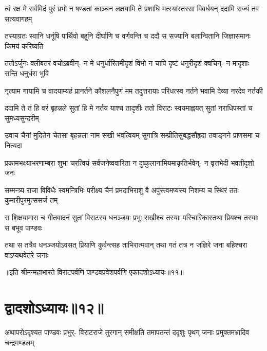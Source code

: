 \fourlineindentedshloka
{त्वं रक्ष मे सर्वमिदं पुरं प्रभो}
{न षण्डतां काञ्चन लक्षयामि ते}
{प्रशाधि मत्स्यांस्तरसा विवर्धयन्}
{ददामि राज्यं तव सत्यवागहम्}



\fourlineindentedshloka
{तस्याग्रतः स्वानि धनूंषि पार्थिवो}
{बहूनि दीर्घाणि च वर्णवन्ति च}
{ददौ स सज्यानि बलान्वितानि}
{जिज्ञासमानः किमयं करिष्यति}


\fourlineindentedshloka
{ततोऽर्जुनः क्लीबतरं वचोऽब्रवीन्-}
{न मे धनुर्धारितमीदृशं विभो}
{न चापि दृष्टं धनुरीदृशं क्वचिन्-}
{न मादृशाः सन्ति धनुर्धरा भुवि}


\fourlineindentedshloka
{नृत्याम गायामि च वादयाम्यहं}
{प्रानर्तने कौशलनैपुणं मम}
{तदुत्तरायाः परिधत्स्व नर्तने}
{भवामि देव्या नरदेव नर्तकी}




\fourlineindentedshloka
{ददामि ते तं हि वरं बृहन्नले}
{सुतां हि मे नर्तय याश्च तादृशीः}
{ततो विराटः स्वयमाह्वयत् सुतां}
{नराधिपस्तां च सुमध्यसुन्दरीम्}


\fourlineindentedshloka
{उवाच चैनां मुदितेन चेतसा}
{बृहन्नला नाम सखी भवत्वियम्}
{सुगात्रि सम्प्रीतिसुबद्धसौहृदा}
{तवाङ्गने प्राणसमा च नित्यदा}


\fourlineindentedshloka
{प्रकामभक्ष्याभरणाम्बरा शुभा}
{चरत्वियं सर्वजनेष्ववारिता}
{न दुष्कुलानामियमाकृतिर्भवेन्-}
{न वृत्तभेदी भवतीदृशो जनः}



\fourlineindentedshloka
{सम्मन्त्र्य राजा विविधैः स्वमन्त्रिभिः}
{परीक्ष्य चैनं प्रमदाभिराशु वै}
{अपुंस्त्वमप्यस्य निशम्य च स्थिरं}
{ततः कुमारीपुरमुत्ससर्ज तम्}


\fourlineindentedshloka
{स शिक्षयामास च गीतवादनं}
{सुतां विराटस्य धनञ्जयः प्रभुः}
{सखीश्च तस्याः परिचारिकास्तथा}
{प्रियश्च तस्याः स बभूव पाण्डवः}


\fourlineindentedshloka
{तथा स तत्रैव धनञ्जयोऽवसत्}
{प्रियाणि कुर्वन्त्सह ताभिरात्मवान्}
{तथा गतं तत्र न जज्ञिरे जना}
{बहिश्चरा वाऽप्यथवेतरे जनाः}

॥इति श्रीमन्महाभारते विराटपर्वणि पाण्डवप्रवेशपर्वणि एकादशोऽध्यायः॥११॥

\chapter{द्वादशोऽध्यायः॥१२॥}

\fourlineindentedshloka
{अथापरोऽदृश्यत पाण्डवः प्रभुर्-}
{विराटराजे तुरगान् समीक्षति}
{तमापतन्तं ददृशुः पृथग् जनाः}
{प्रमुक्तमभ्रादिव चन्द्रमण्डलम्}


